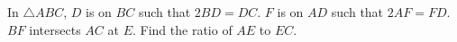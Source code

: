 In $\triangle ABC$, $D$ is on $BC$ such that $2BD=DC$. $F$ is on $AD$ such that $2AF=FD$. $BF$ intersects $AC$ at $E$. Find the ratio of $AE$ to $EC$.

